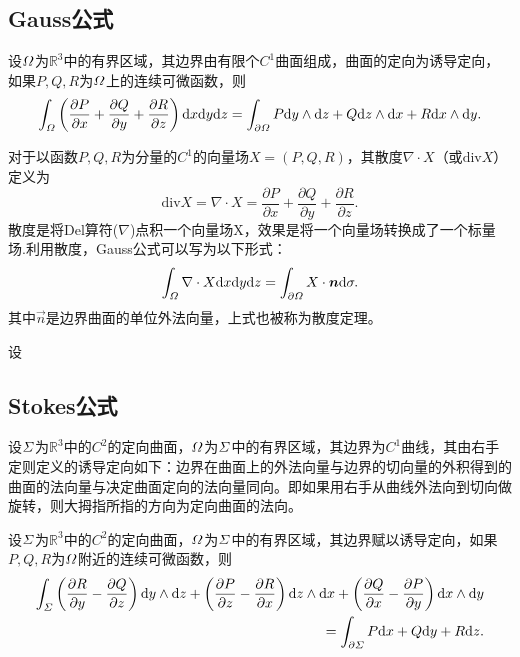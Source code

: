     \subsection{Gauss公式}
    \begin{theorem}[Gauss公式]
        设\(\mit\Omega\)为\(\mathbb{R}^3\)中的有界区域，其边界由有限个\(C^1\)曲面组成，曲面的定向为诱导定向，如果\(P,Q,R\)为\(\mit\Omega\)上的连续可微函数，则\[\int_{\mit\Omega}\left(\frac{\partial P}{\partial x}+\frac{\partial Q}{\partial y}+\frac{\partial R}{\partial z}\right)\mathrm{d} x\mathrm{d} y\mathrm{d} z=\int_{\partial\mit\Omega}P\mathrm{d} y\wedge\mathrm{d} z+Q\mathrm{d} z\wedge\mathrm{d} x+R\mathrm{d} x\wedge\mathrm{d} y.\]
    \end{theorem}
    
    对于以函数\(P,Q,R\)为分量的\(C^1\)的向量场\(X=(P,Q,R)\)，其散度\(\nabla\cdot X\)（或\(\mathrm{div}X\)）定义为\[\mathrm{div}X=\nabla\cdot X=\frac{\partial P}{\partial x}+\frac{\partial Q}{\partial y}+\frac{\partial R}{\partial z}.\]
    散度是将Del算符(\(\nabla\))点积一个向量场X，效果是将一个向量场转换成了一个标量场.利用散度，Gauss公式可以写为以下形式：\[\int_{\mit\Omega}\nabla\cdot X\mathrm{d} x\mathrm{d} y\mathrm{d} z=\int_{\partial\mit\Omega}X\cdot\boldsymbol{n}\mathrm{d}\sigma.\]
    其中\(\vec{n}\)是边界曲面的单位外法向量，上式也被称为散度定理。
    \begin{example}[Green恒等式]
        设
    \end{example}

    \subsection{Stokes公式}

    设\(\mit\Sigma\)为\(\mathbb{R}^3\)中的\(C^2\)的定向曲面，\(\mit\Omega\)为\(\mit\Sigma\)中的有界区域，其边界为\(C^1\)曲线，其由右手定则定义的诱导定向如下：边界在曲面上的外法向量与边界的切向量的外积得到的曲面的法向量与决定曲面定向的法向量同向。即如果用右手从曲线外法向到切向做旋转，则大拇指所指的方向为定向曲面的法向。
    \begin{theorem}[Stokes公式]
        设\(\mit\Sigma\)为\(\mathbb{R}^3\)中的\(C^2\)的定向曲面，\(\mit\Omega\)为\(\mit\Sigma\)中的有界区域，其边界赋以诱导定向，如果\(P,Q,R\)为\(\mit\Omega\)附近的连续可微函数，则
        \begin{equation*}\begin{split}
            \int_{\mit\Sigma}\left(\frac{\partial R}{\partial y}-\frac{\partial Q}{\partial z}\right)\mathrm{d} y\wedge\mathrm{d} z+\left(\frac{\partial P}{\partial z}-\frac{\partial R}{\partial x}\right)\mathrm{d} z\wedge\mathrm{d} x+\left(\frac{\partial Q}{\partial x}-\frac{\partial P}{\partial y}\right)\mathrm{d} x\wedge\mathrm{d} y
            \\=\int_{\partial\mit\Sigma}P\mathrm{d} x+Q\mathrm{d} y+R\mathrm{d} z.
        \end{split}\end{equation*}
    \end{theorem}

